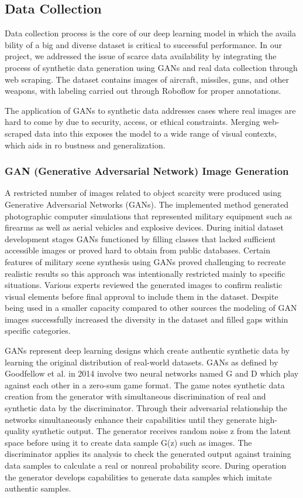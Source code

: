 \documentclass[fleqn,10pt,lineno]{wlpeerj}
\begin{document}
\subsection{Data Collection}

Data collection process is the core of our deep learning model in which the availa bility of a big and diverse dataset is critical to successful performance. In our project, we addressed the issue of scarce data availability by integrating the process of synthetic data generation using GANs and real data collection through web scraping. The dataset contains images of aircraft, missiles, guns, and other weapons, with labeling carried out through Roboflow for proper annotations. 

The application of GANs to synthetic data addresses cases where real images are hard to come by due to security, access, or ethical constraints. Merging web-scraped data into this exposes the model to a wide range of visual contexts, which aids in ro bustness and generalization.  

\subsubsection{GAN (Generative Adversarial Network) Image Generation}

A restricted number of images related to object scarcity were produced using Generative Adversarial Networks (GANs). The implemented method generated photographic computer simulations that represented military equipment such as firearms as well as aerial vehicles and explosive devices. During initial dataset development stages GANs functioned by filling classes that lacked sufficient accessible images or proved hard to obtain from public databases. Certain features of military scene synthesis using GANs proved challenging to recreate realistic results so this approach was intentionally restricted mainly to specific situations. Various experts reviewed the generated images to confirm realistic visual elements before final approval to include them in the dataset. Despite being used in a smaller capacity compared to other sources the modeling of GAN images successfully increased the diversity in the dataset and filled gaps within specific categories. 

GANs represent deep learning designs which create authentic synthetic data by learning the original distribution of real-world datasets. GANs as defined by Goodfellow et al. in 2014 involve two neural networks named G and D which play against each other in a zero-sum game format. The game notes synthetic data creation from the generator with simultaneous discrimination of real and synthetic data by the discriminator. Through their adversarial relationship the networks simultaneously enhance their capabilities until they generate high-quality synthetic output. The generator receives random noise z from the latent space before using it to create data sample G(z) such as images. The discriminator applies its analysis to check the generated output against training data samples to calculate a real or nonreal probability score. During operation the generator develops capabilities to generate data samples which imitate authentic samples.  
\end{document}
